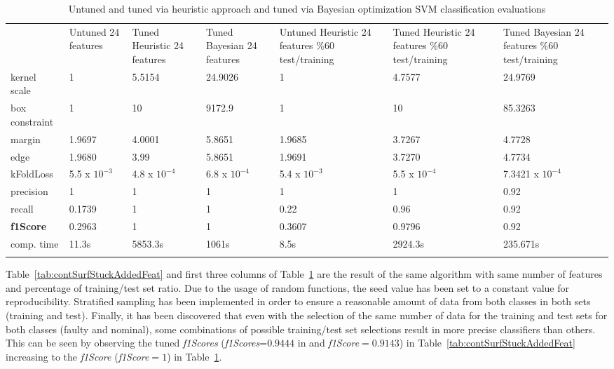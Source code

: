 \begin{table}
	\centering
\caption{Untuned and tuned via heuristic approach and tuned via Bayesian optimization SVM classification evaluations}
\label{tab:contSurfStuckAddedFeatDiffPercentage}       %
\begin{tabular}{p{1.5cm}p{2cm}p{2.3cm}p{2.3cm}p{2.3cm}p{2.3cm}p{2.4cm}}
\hline\noalign{\smallskip}
 & Untuned  24 features & Tuned Heuristic 24 features & Tuned Bayesian 24 features & Untuned Heuristic 24 features \%60 test/training & Tuned Heuristic 24 features \%60 test/training & Tuned Bayesian 24 features \%60 test/training\\
\noalign{\smallskip}\hline\noalign{\smallskip}
kernel scale & 1 & 5.5154 & 24.9026 & 1 & 4.7577 & 24.9769\\
box constraint & 1 & 10 & 9172.9 & 1 & 10 & 85.3263\\
margin & 1.9697 & 4.0001 & 5.8651& 1.9685 & 3.7267 & 4.7728\\
edge & 1.9680 & 3.99 & 5.8651 & 1.9691 & 3.7270 & 4.7734\\
kFoldLoss & 5.5 x $10^{-3}$ & 4.8 x $10^{-4}$ & 6.8 x $10^{-4}$ & 5.4 x $10^{-3}$ & 5.5 x $10^{-4}$ & 7.3421 x $10^{-4}$\\
precision & 1 & 1 & 1 & 1 & 1 & 0.92\\
recall & 0.1739 & 1 & 1 & 0.22 & 0.96 & 0.92\\
\textbf{f1Score} & 0.2963 & 1 & 1 & 0.3607 & 0.9796 & 0.92\\
comp. time & 11.3s & 5853.3s & 1061s & 8.5s & 2924.3s & 235.671s\\
\noalign{\smallskip}\hline
\end{tabular}
\end{table}


Table~\ref{tab:contSurfStuckAddedFeat} and first three columns of Table~\ref{tab:contSurfStuckAddedFeatDiffPercentage} are the result of the same algorithm with same number of features and percentage of training/test set ratio. 
Due to the usage of random functions, the seed value has been set to a constant value for reproducibility. 
Stratified sampling has been implemented in order to ensure a reasonable amount of data from both classes in both sets (training and test). 
Finally, it has been discovered that even with the selection of the same number of data for the training and test sets for both classes (faulty and nominal), some combinations of possible training/test set selections result in more precise classifiers than others. 
This can be seen by observing the tuned \emph{f1Scores} (\emph{f1Scores}=$0.9444$ in and \emph{f1Score}$=0.9143$) in Table~\ref{tab:contSurfStuckAddedFeat} increasing to the \emph{f1Score} (\emph{f1Score}$=1$) in Table~\ref{tab:contSurfStuckAddedFeatDiffPercentage}.


